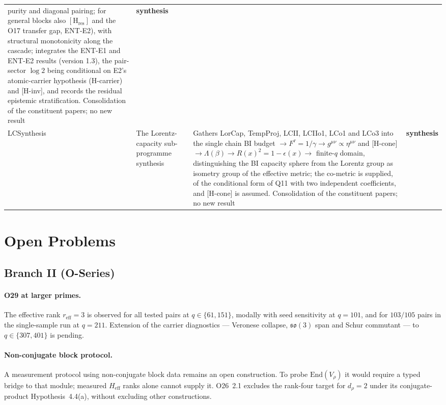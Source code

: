 \documentclass[11pt,a4paper]{article}
\newcommand{\ssynth}{\textcolor{csynth}{\textbf{synthesis}}}
\begin{document}
\begin{longtable}{@{}p{1.70cm}p{2.9cm}p{1.3cm}p{6.25cm}>{\raggedright\arraybackslash}p{2.0cm}@{}}
      purity and diagonal pairing; for general blocks also $[\mathrm{H}_{\mathrm{res}}]$ and the O17 transfer
      gap, ENT-E2), with structural
      monotonicity along the cascade; integrates the ENT-E1 and ENT-E2 results (version 1.3), the
      pair-sector $\log 2$ being conditional on E2's atomic-carrier hypothesis (H-carrier) and [H-inv],
      and records the residual epistemic stratification. Consolidation of the constituent papers; no new result &
      \ssynth \\[3pt]
      LC\-Synthesis & The Lorentz-capacity sub-programme synthesis & \cite{Beau2026lcsyn} &
      Gathers LorCap, TempProj, LCII, LCIIo1, LCo1 and LCo3 into the single chain
      BI budget $\to F^\tau = 1/\gamma \to g^{\mu\nu} \propto \eta^{\mu\nu}$ and [H-cone] $\to \Lambda(\beta)
      \to R(x)^2 = 1-\epsilon(x) \to$ finite-$q$ domain, distinguishing the BI capacity sphere from the
      Lorentz group as isometry group of the effective metric; the co-metric is supplied, of the conditional form
      of Q11 with two independent coefficients, and [H-cone] is assumed.
      Consolidation of the constituent papers; no new result &
      \ssynth \\[3pt]
    \end{longtable}

  \section{Open Problems}
  \label{sec:open}

  \subsection{Branch II (O-Series)}

    \paragraph{O29 at larger primes.}
      The effective rank $r_{\mathrm{eff}} = 3$ is observed for all tested pairs at
      $q\in\{61,151\}$, modally with seed sensitivity at $q=101$, and for $103/105$ pairs in the
      single-sample run at $q=211$.
      Extension of the carrier diagnostics --- Veronese collapse, $\mathfrak{so}(3)$ span and
      Schur commutant --- to $q \in \{307, 401\}$ is pending.

    \paragraph{Non-conjugate block protocol.}
      A measurement protocol using non-conjugate block data remains an open construction.
      To probe $\mathrm{End}(V_\rho)$ it would require a typed bridge to that module;
      measured $H_{\mathrm{eff}}$ ranks alone cannot supply it.
      O26~2.1 excludes the rank-four target for $d_\rho=2$ under its conjugate-product
      Hypothesis~4.4(a), without excluding other constructions.
\end{document}
